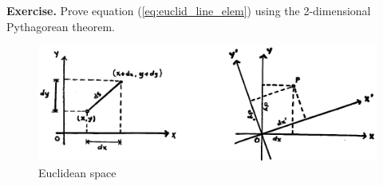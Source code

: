 \documentclass[11pt, a4paper,oneside,openright]{book}
\numberwithin{equation}{section}
\begin{document}
\par\vspace{\baselineskip}

{\bf Exercise.} Prove equation (\ref{eq:euclid_line_elem}) using the 2-dimensional Pythagorean theorem.

\par\vspace{\baselineskip}
\begin{figure}[ht]
\begin{center}
\includegraphics[scale=0.6]{Draw/lec2_6.png}
\end{center}
\caption{Euclidean space}
\label{fig:lec2_6}
\end{figure}
\end{document}
